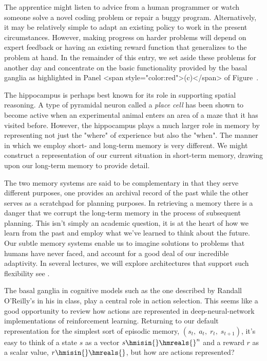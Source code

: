 The apprentice might listen to advice from a human programmer or watch someone solve a novel coding problem or repair a buggy program. Alternatively, it may be relatively simple to adapt an existing policy to work in the present circumstances. However, making progress on harder problems will depend on expert feedback or having an existing reward function that generalizes to the problem at hand. In the remainder of this entry, we set aside these problems for another day and concentrate on the basic functionality provided by the basal ganglia as highlighted in Panel {\rawhtml<span style="color:red">(c)</span>\endrawhtml} \emdash{} of Figure~{}.


The hippocampus is perhaps best known for its role in supporting spatial reasoning. A type of pyramidal neuron called a {\it{place cell}} has been shown to become active when an experimental animal enters an area of a maze that it has visited before. However, the hippocampus plays a much larger role in memory by representing not just the "where" of experience but also the "when". The manner in which we employ short- and long-term memory is very different. We might construct a representation of our current situation in short-term memory, drawing upon our long-term memory to provide detail. 

The two memory systems are said to be complementary in that they serve different purposes, one provides an archival record of the past while the other serves as a scratchpad for planning purposes. In retrieving a memory there is a danger that we corrupt the long-term memory in the process of subsequent planning. This isn't simply an academic question, it is at the heart of how we learn from the past and employ what we've learned to think about the future. Our subtle memory systems enable us to imagine solutions to problems that humans have never faced, and account for a good deal of our incredible adaptivity. In several lectures, we will explore architectures that support such flexibility  \emdash{} see {{}}.


The basal ganglia in cognitive models such as the one described by Randall O'Reilly's in his {} in class, play a central role in action selection. This seems like a good opportunity to review how actions are represented in deep-neural-network implementations of reinforcement learning. Returning to our default representation for the simplest sort of episodic memory, $(s_{t},\;a_{t},\;r_{t},\;s_{t+1})$, it’s easy to think of a state $s$ as a vector $s \hmisin{} \hmreals{}^{n}$ and a reward $r$ as a scalar value, $r \hmisin{} \hmreals{}$, but how are actions represented?

